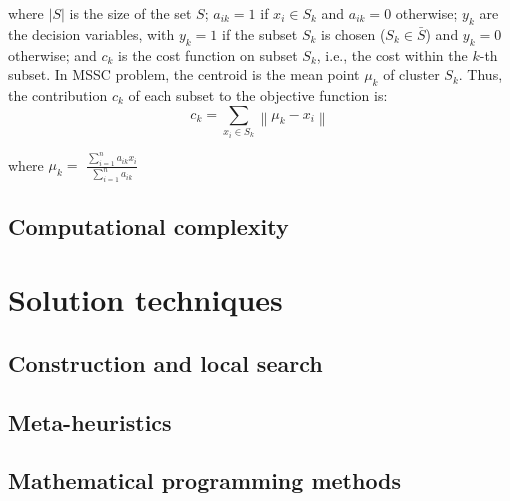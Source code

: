 \noindent where $\left | S \right |$ is the size of the set $S$; $a_{ik} = 1$ if $x_i \in S_k$ and $a_{ik} = 0$ otherwise; $y_k$ are the decision variables, with $y_k = 1$ if the subset $S_k$ is chosen ($S_k \in \bar{S}$) and $y_k = 0$ otherwise; and $c_k$ is the cost function on subset $S_k$, i.e., the cost within the $k$-th subset. In MSSC problem, the centroid is the mean point $\mu_k$ of cluster $S_k$. Thus, the contribution $c_k$ of each subset to the objective function is:
	\begin{equation}
	c_k = \sum_{x_i \in S_k}\left \| \mu_k - x_i \right \|
	\end{equation}
	\begin{center}
	where $\mu_k = $ \Large $\frac{\sum_{i = 1}^{n}a_{ik}x_i}{\sum_{i = 1}^{n}a_{ik}}$	
	\end{center}
	
\subsection{Computational complexity}

\section{Solution techniques}

\subsection{Construction and local search}

\subsection{Meta-heuristics}

\subsection{Mathematical programming methods}